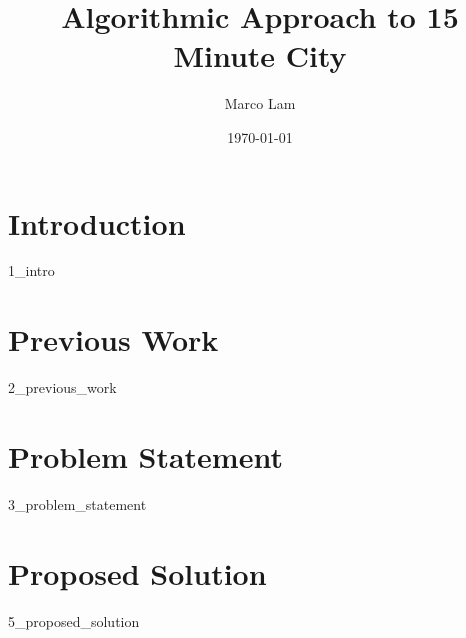 \documentclass{article}
\title{Algorithmic Approach to 15 Minute City}
\author{Marco Lam}
\date{\today}
\begin{document}
\maketitle

\newpage

\tableofcontents

\newpage

\section{Introduction}

{1_intro}

\section{Previous Work}

{2_previous_work}

\newpage

\section{Problem Statement}

{3_problem_statement}



\newpage

\section{Proposed Solution}

{5_proposed_solution}

\newpage


\end{document}
